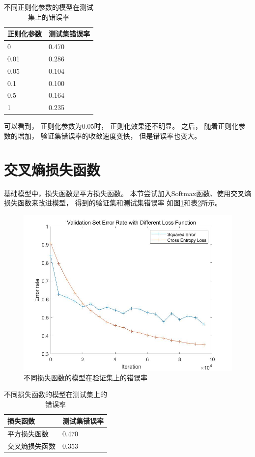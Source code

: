 \documentclass{article}
\begin{document}
\begin{table}[p]
\centering
\begin{tabular}{|l|l|} 
\hline
正则化参数 & 测试集错误率 \\
\hline
0 & 0.470 \\
0.01 & 0.286 \\
0.05 & 0.104 \\
0.1 & 0.100 \\
0.5 & 0.164 \\
1 & 0.235 \\
\hline
\end{tabular}
\caption{不同正则化参数的模型在测试集上的错误率}
\label{table:4}
\end{table}

可以看到，
正则化参数为0.05时，
正则化效果还不明显。
之后，
随着正则化参数的增加，
验证集错误率的收敛速度变快，
但是错误率也变大。

\section{交叉熵损失函数}

基础模型中，损失函数是平方损失函数。
本节尝试加入Softmax函数、使用交叉熵损失函数来改进模型，
得到的验证集和测试集错误率
如图\ref{fig:5}和表\ref{table:5}所示。

\begin{figure}[p]
\includegraphics[width=\textwidth]{5.jpg}
\caption{不同损失函数的模型在验证集上的错误率}
\label{fig:5}
\end{figure}

\begin{table}[p]
\centering
\begin{tabular}{|l|l|} 
\hline
损失函数 & 测试集错误率 \\
\hline
平方损失函数 & 0.470 \\
交叉熵损失函数 & 0.353 \\
\hline
\end{tabular}
\caption{不同损失函数的模型在测试集上的错误率}
\label{table:5}
\end{table}
\end{document}
